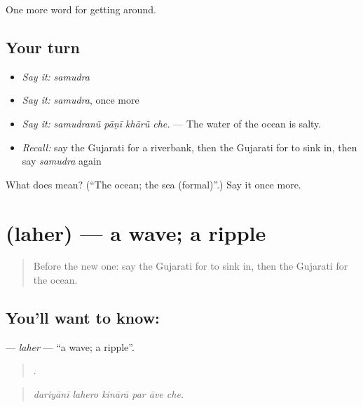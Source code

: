 \begin{grammarlens}[title={What you've built}]
One more word for getting around.
\end{grammarlens}

\subsection*{Your turn}
\begin{itemize}
\raggedright
  \item \emph{Say it:} \emph{samudra}
  \item \emph{Say it:} \emph{samudra}, once more
  \item \emph{Say it:} \emph{samudranũ pāṇī khārũ che.} — The water of the ocean is salty.
  \item \emph{Recall:} say the Gujarati for a riverbank, then the Gujarati for to sink in, then say \emph{samudra} again
\end{itemize}

\begin{tcolorbox}[breakable,colback=teal!4,colframe=teal!35!black,title={Before you move on}]
What does  mean? (\textquotedblleft{}The ocean; the sea (formal)\textquotedblright{}.) Say it once more.
\end{tcolorbox}
\section[\texorpdfstring{\gu{લહેર} (laher)}{લહેર (laher)}]{ (laher) — a wave; a ripple}

\label{lesson:GU-C442-laher}



\begin{quote}
Before the new one: say the Gujarati for to sink in, then the Gujarati for the ocean.
\end{quote}

\subsection*{You'll want to know: }
\textbf{} — \emph{laher} — \textquotedblleft{}a wave; a ripple\textquotedblright{}.

\begin{quote}
     .
\end{quote}

\begin{quote}
\emph{dariyānī lahero kinārā par āve che.}
\end{quote}

